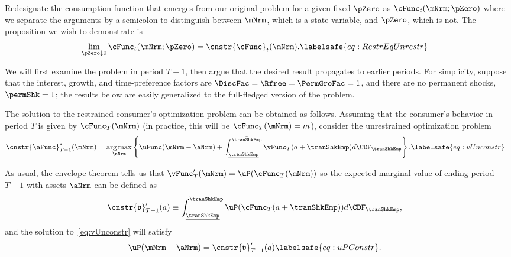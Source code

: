 \documentclass[\econtexRoot/BufferStockTheory]{subfiles}
\begin{document}
Redesignate the consumption function that emerges from our original problem for a given fixed $\pZero$ as $\cFunc_{t}(\mNrm;\pZero)$ where we separate the arguments by a semicolon to distinguish between $\mNrm$, which is a state variable, and $\pZero$, which is not.
The proposition we wish to demonstrate is
\begin{equation}\begin{gathered}\begin{aligned}
      \lim_{\pZero \downarrow 0} \cFunc_{t}(\mNrm;\pZero)  & = \cnstr{\cFunc}_{t}(\mNrm). \labelsafe{eq:RestrEqUnrestr} 
    \end{aligned}\end{gathered}\end{equation}

We will first examine the problem in period $T-1$, then argue that the desired result propagates to earlier periods.
For simplicity, suppose that the interest, growth, and time-preference factors are $\DiscFac = \Rfree = \PermGroFac = 1$, and there are no permanent shocks, $\permShk=1$; the results below are easily generalized to the full-fledged version of the problem.

The solution to the restrained consumer's optimization problem can be obtained as follows.
Assuming that the consumer's behavior in period $T$ is given by $\cFunc_{T}(\mNrm)$ (in practice, this will be $\cFunc_{T}(\mNrm)=m$), consider the unrestrained optimization problem
\begin{equation}\begin{gathered}\begin{aligned}
      \cnstr{\aFunc}^{*}_{T-1}(\mNrm)  & = \underset{\aNrm}{\arg \max} \left\{\uFunc(\mNrm-\aNrm) +  \int_{\underline{\tranShkEmp}}^{\bar{\tranShkEmp}} \vFunc_{T}(a+\tranShkEmp) d\CDF_{\tranShkEmp} \right\}. \labelsafe{eq:vUnconstr}
    \end{aligned}\end{gathered}\end{equation}

As usual, the envelope theorem tells us that $\vFunc_{T}^{\prime}(\mNrm)=\uP(\cFunc_{T}(\mNrm))$ so the expected marginal value of ending period $T-1$ with assets $\aNrm$ can be defined as
\begin{equation}\begin{gathered}\begin{aligned}
      \cnstr{\mathfrak{v}}_{T-1}^{\prime}(a)  & \equiv  \int_{\underline{\tranShkEmp}}^{\bar{\tranShkEmp}} \uP(\cFunc_{T}(a+\tranShkEmp)) d\CDF_{\tranShkEmp}, \notag
    \end{aligned}\end{gathered}\end{equation}
and the solution to~\eqref{eq:vUnconstr} will satisfy
\begin{equation}\begin{gathered}\begin{aligned}
      \uP(\mNrm-\aNrm)  & =  \cnstr{\mathfrak{v}}_{T-1}^{\prime}(a) \labelsafe{eq:uPConstr}.
    \end{aligned}\end{gathered}\end{equation}
\end{document}
